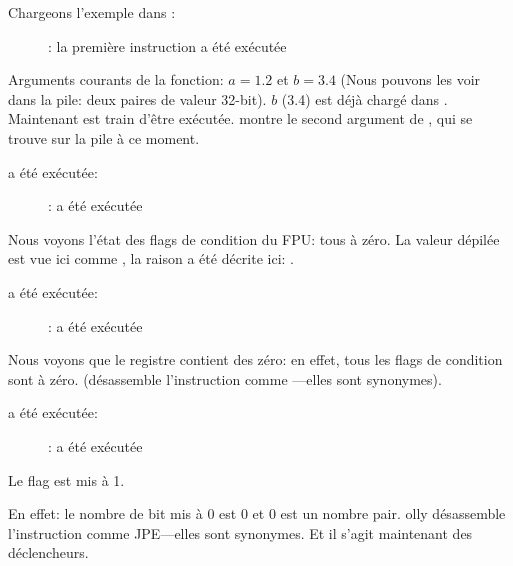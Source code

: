 ﻿\clearpage
{}
\myindex{\olly}

Chargeons l'exemple dans \olly:

\begin{figure}[H]
\centering
{}
\caption{\olly: la première instruction \FLD a été exécutée}
\label{fig:FPU_comparison_case1_olly1}
\end{figure}

Arguments courants de la fonction: $a=1.2$ et $b=3.4$ (Nous pouvons les voir dans
la pile: deux paires de valeur 32-bit).
$b$ (3.4) est déjà chargé dans .
Maintenant \FCOMP est train d'être exécutée.
\olly montre le second argument de \FCOMP, qui se trouve sur la pile à ce moment.

\clearpage
\FCOMP a été exécutée:

\begin{figure}[H]
\centering
{}
\caption{\olly: \FCOMP a été exécutée}
\label{fig:FPU_comparison_case1_olly2}
\end{figure}

Nous voyons l'état des flags de condition du \ac{FPU}: tous à zéro.
La valeur dépilée est vue ici comme , la raison a été décrite ici:
.

\clearpage
\FNSTSW a été exécutée:
\begin{figure}[H]
\centering
{}
\caption{\olly: \FNSTSW a été exécutée}
\label{fig:FPU_comparison_case1_olly3}
\end{figure}

Nous voyons que le registre  contient des zéro: en effet, tous les flags
de condition sont à zéro.
(\olly désassemble l'instruction \FNSTSW comme ---elles sont synonymes).

\clearpage
\TEST a été exécutée:

\begin{figure}[H]
\centering
{}
\caption{\olly: \TEST a été exécutée}
\label{fig:FPU_comparison_case1_olly4}
\end{figure}

Le flag  est mis à 1.

En effet: le nombre de bit mis à 0 est 0 et 0 est un nombre pair.
olly désassemble l'instruction  comme \ac{JPE}---elles sont synonymes.
Et il s'agit maintenant des déclencheurs.

